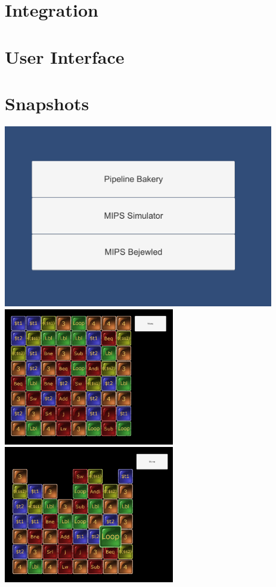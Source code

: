 \documentclass[12pt]{article}
\begin{document}
	\section{Integration}
	\section{User Interface}
	\section{Snapshots}
	\includegraphics[height=8cm]{MainMenu.png}\\
	\includegraphics[height=6cm]{MIPSBejeweled.png}
	\includegraphics[height=6cm]{BejeweledHowTo.png}\\
\end{document}
